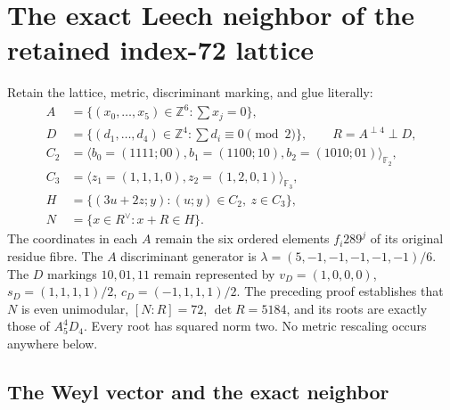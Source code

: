 \section{The exact Leech neighbor of the retained index-72 lattice}
\label{esnl:sec:neighbor}

Retain the lattice, metric, discriminant marking, and glue literally:
\[
 \begin{split}
 A&=\{(x_0,\ldots,x_5)\in\mathbb Z^6:\sum x_j=0\},\\
 D&=\{(d_1,\ldots,d_4)\in\mathbb Z^4:\sum d_i\equiv0\pmod2\},
 \qquad R=A^{\perp4}\perp D,\\
 C_2&=\langle b_0=(1111;00),b_1=(1100;10),b_2=(1010;01)\rangle_{\mathbb F_2},\\
 C_3&=\langle z_1=(1,1,1,0),z_2=(1,2,0,1)\rangle_{\mathbb F_3},\\
 H&=\{(3u+2z;y):(u;y)\in C_2,\ z\in C_3\},\\
 N&=\{x\in R^\vee:x+R\in H\}.
 \end{split}
\]
The coordinates in each $A$ remain the six ordered elements $f_i289^j$
of its original residue fibre. The $A$ discriminant generator is
$\lambda=(5,-1,-1,-1,-1,-1)/6$. The $D$ markings $10,01,11$
remain represented by $v_D=(1,0,0,0)$,
$s_D=(1,1,1,1)/2$, $c_D=(-1,1,1,1)/2$.
The preceding proof establishes that $N$ is even unimodular,
$[N:R]=72$, $\det R=5184$, and its roots are exactly those of
$A_5^4D_4$. Every root has squared norm two. No metric rescaling
occurs anywhere below.

\subsection{The Weyl vector and the exact neighbor}

